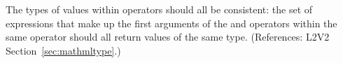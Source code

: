 The types of values within  operators should all
be consistent: the set of expressions that make up the first
arguments of the  and  operators
within the same  operator should all return
values of the same type.  (References: L2V2 Section~\ref{sec:mathmltype}.)
